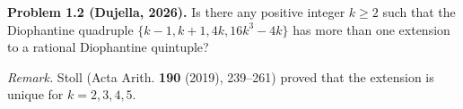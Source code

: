 \textbf{Problem 1.2 (Dujella, 2026).} Is there any positive integer $k \geqslant 2$ such that the Diophantine quadruple $\{k-1, k+1, 4k, 16k^3-4k\}$ has more than one extension to a rational Diophantine quintuple?

\medskip

\textit{Remark.} Stoll (Acta Arith. \textbf{190} (2019), 239--261) proved that the extension is unique for $k = 2, 3, 4, 5$.
